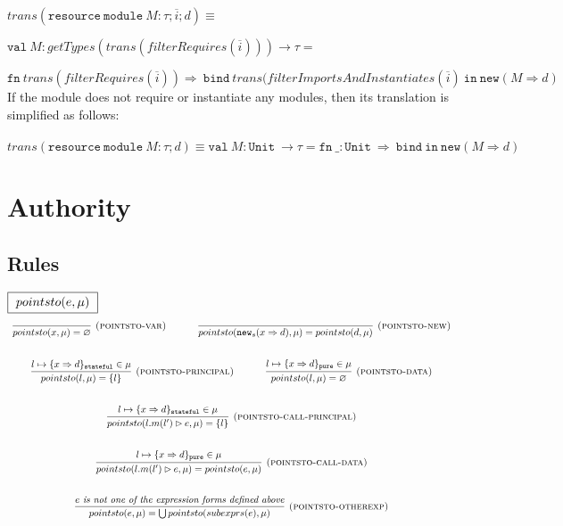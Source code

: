 \documentclass{llncs}
\newcommand{\keywadj}[1]{\mathtt{#1}}
\newcommand{\keyw}[1]{\keywadj{#1}~}
\begin{document}
\noindent$trans(\keyw{resource} \keyw{module} M : \tau; \overline{i}; d) \equiv$

$\keyw{val} M : getTypes(trans(filterRequires(\overline{i}))) \rightarrow \tau = $

$\keyw{fn} trans(filterRequires(\overline{i})) \Rightarrow~\keyw{bind} trans(filterImportsAndInstantiates(\overline{i})~\keyw{in} \keywadj{new}(M \Rightarrow d)$\\

\noindent If the module does not require or instantiate any modules, then its translation is simplified as follows:
\\\\
\noindent$trans(\keyw{resource} \keyw{module} M : \tau; d) \equiv \keyw{val} M : \keyw{Unit} \rightarrow \tau = \keyw{fn} \_ : \keyw{Unit} \Rightarrow~\keyw{bind} \keyw{in} \keywadj{new}(M \Rightarrow d)$


\newpage

\section{Authority}

\subsection{Rules}

\vspace{1pt}
$\fbox{$~pointsto(e, \mu)~$}$
\[
\begin{array}{c}
\infer[\textsc{(pointsto-var)}]
  {pointsto(x,\mu) = \varnothing }
  {}%
~~~~~~~~~~
\infer[\textsc{(pointsto-new)}]
  {pointsto(\keywadj{new}_{s}(x \Rightarrow d),\mu) = pointsto(d,\mu) }
  {}\\[5ex]

\infer[\textsc{(pointsto-principal)}]
  {pointsto(l,\mu) = \{ l \}}
  {l \mapsto \{ x \Rightarrow d \}_\keywadj{stateful} \in \mu}%
~~~~~~~~~~
\infer[\textsc{(pointsto-data)}]
  {pointsto(l,\mu) = \varnothing }
  {l \mapsto \{ x \Rightarrow d \}_\keywadj{pure} \in \mu}\\[5ex]

\infer[\textsc{(pointsto-call-principal)}]
  {pointsto(l.m(l') \rhd e,\mu) = \{l\} }
  {l \mapsto \{ x \Rightarrow d \}_\keywadj{stateful} \in \mu}\\[5ex]

\infer[\textsc{(pointsto-call-data)}]
  {pointsto(l.m(l') \rhd e,\mu) = pointsto(e,\mu)}
  {l \mapsto \{ x \Rightarrow d \}_\keywadj{pure} \in \mu}\\[5ex]

\infer[\textsc{(pointsto-otherexp)}]
  {pointsto(e,\mu) = \bigcup pointsto(subexprs(e),\mu) }
  {\textit{$e$ is not one of the expression forms defined above}}\\[5ex]

\end{array}
\]
\end{document}
